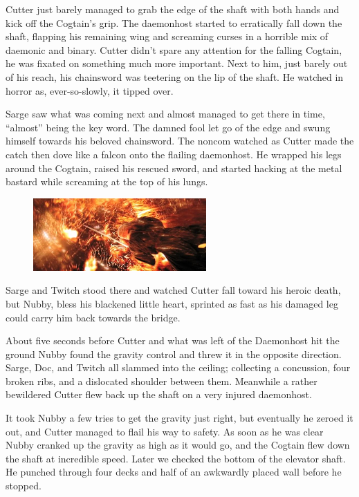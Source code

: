 Cutter just barely managed to grab the edge of the shaft with both hands and kick off the Cogtain’s grip. 
The daemonhost started to erratically fall down the shaft, flapping his remaining wing and screaming curses in a horrible mix of daemonic and binary. 
Cutter didn’t spare any attention for the falling Cogtain, he was fixated on something much more important. 
Next to him, just barely out of his reach, his chainsword was teetering on the lip of the shaft. 
He watched in horror as, ever-so-slowly, it tipped over.

Sarge saw what was coming next and almost managed to get there in time, “almost” being the key word. 
The damned fool let go of the edge and swung himself towards his beloved chainsword. 
The noncom watched as Cutter made the catch then dove like a falcon onto the flailing daemonhost. 
He wrapped his legs around the Cogtain, raised his rescued sword, and started hacking at the metal bastard while screaming at the top of his lungs.

\begin{figure}
	\begin{center}
		\includegraphics[width=\figwidth]{pics/7/49.png}
	\end{center}
\end{figure}
Sarge and Twitch stood there and watched Cutter fall toward his heroic death, but Nubby, bless his blackened little heart, sprinted as fast as his damaged leg could carry him back towards the bridge.

About five seconds before Cutter and what was left of the Daemonhost hit the ground Nubby found the gravity control and threw it in the opposite direction. 
Sarge, Doc, and Twitch all slammed into the ceiling; 
collecting a concussion, four broken ribs, and a dislocated shoulder between them. 
Meanwhile a rather bewildered Cutter flew back up the shaft on a very injured daemonhost.

It took Nubby a few tries to get the gravity just right, but eventually he zeroed it out, and Cutter managed to flail his way to safety. 
As soon as he was clear Nubby cranked up the gravity as high as it would go, and the Cogtain flew down the shaft at incredible speed. 
Later we checked the bottom of the elevator shaft. 
He punched through four decks and half of an awkwardly placed wall before he stopped. 


